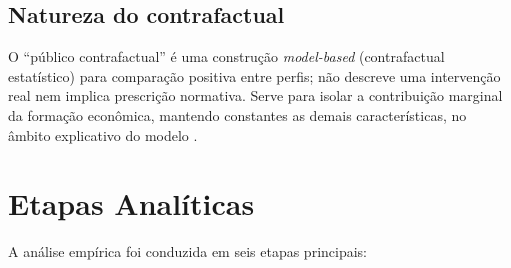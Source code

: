 \subsection{Natureza do contrafactual}
O ``público contrafactual'' é uma construção \textit{model-based} (contrafactual estatístico) para comparação positiva entre perfis; não descreve uma intervenção real nem implica prescrição normativa. Serve para isolar a contribuição marginal da formação econômica, mantendo constantes as demais características, no âmbito explicativo do modelo \cite{hausman2008}.



\section{Etapas Analíticas}

A análise empírica foi conduzida em seis etapas principais:

